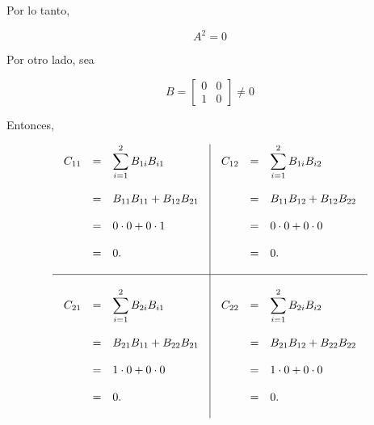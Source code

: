 \begin{enumerate}[1.]
	Por lo tanto,

	$$A^2=0$$

	Por otro lado, sea

	$$B=\left[\begin{array}{rr}
	    0 & 0\\
	    1 & 0
	\end{array}\right]\neq 0$$

	Entonces,

	$$
	\begin{array}{c|c}
	    \begin{array}{rcl}
		C_{11} &=& \displaystyle \sum_{i=1}^2 B_{1i}B_{i1}\\\\
		       &=& B_{11}B_{11} + B_{12}B_{21}\\\\
		       &=& 0\cdot 0 + 0\cdot 1\\\\
		       &=& 0.
	    \end{array}&
	    \begin{array}{rcl}
		C_{12} &=& \displaystyle \sum_{i=1}^2 B_{1i}B_{i2}\\\\
		       &=& B_{11}B_{12} + B_{12}B_{22}\\\\
		       &=& 0\cdot 0 + 0\cdot 0\\\\
		       &=& 0.
	    \end{array}\\\\
	    \hline\\
	    \begin{array}{rcl}
		C_{21} &=& \displaystyle \sum_{i=1}^2 B_{2i}B_{i1}\\\\
		       &=& B_{21}B_{11} + B_{22}B_{21}\\\\
		       &=& 1\cdot 0 + 0\cdot 0\\\\
		       &=& 0.
	    \end{array}&
	    \begin{array}{rcl}
		C_{22} &=& \displaystyle \sum_{i=1}^2 B_{2i}B_{i2}\\\\
		       &=& B_{21}B_{12} + B_{22}B_{22}\\\\
		       &=& 1\cdot 0 + 0\cdot 0\\\\
		       &=& 0.
	    \end{array}\\\\
	\end{array}
	$$


\end{enumerate}
